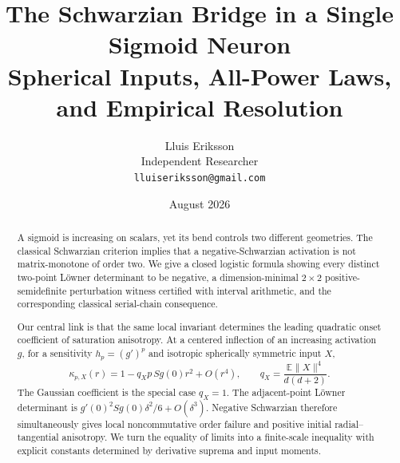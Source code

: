 \documentclass[11pt]{article}
\title{\bfseries The Schwarzian Bridge in a Single Sigmoid Neuron\\
\large Spherical Inputs, All-Power Laws, and Empirical Resolution}
\author{Lluis Eriksson\\Independent Researcher\\\texttt{lluiseriksson@gmail.com}}
\date{August 2026}
\newcommand{\E}{\mathbb E}
\begin{document}
\maketitle

\begin{abstract}
A sigmoid is increasing on scalars, yet its bend controls two different geometries.  The classical Schwarzian
criterion implies that a negative-Schwarzian activation is not matrix-monotone of order two.  We give a closed
logistic formula showing every distinct two-point L\"owner determinant to be negative, a dimension-minimal
$2\times2$ positive-semidefinite perturbation witness certified with interval arithmetic, and the corresponding
classical serial-chain consequence.

Our central link is that the same local invariant determines the leading quadratic onset coefficient of saturation
anisotropy.  At a centered inflection of an increasing activation $g$, for a sensitivity $h_p=(g')^p$ and
isotropic spherically symmetric input $X$,
\[
 \kappa_{p,X}(r)=1-q_Xp\,Sg(0)r^2+O(r^4),\qquad
 q_X=\frac{\E\lVert X\rVert^4}{d(d+2)}.
\]
The Gaussian coefficient is the special case $q_X=1$.  The adjacent-point L\"owner determinant is
$g'(0)^2Sg(0)\delta^2/6+O(\delta^3)$.  Negative Schwarzian therefore simultaneously gives local
noncommutative order failure and positive initial radial--tangential anisotropy.  We turn the equality of limits
into a finite-scale inequality with explicit constants determined by derivative suprema and input moments.


\end{abstract}
\end{document}
